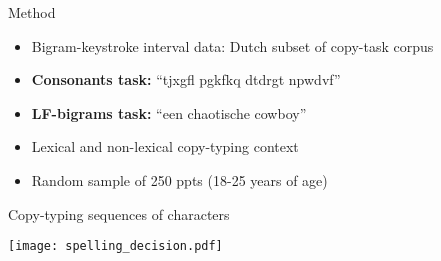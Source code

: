 \begin{frame}{Method}

\begin{itemize}
	\item Bigram-keystroke interval data: Dutch subset of copy-task corpus \parencite{waes2019,van2019multilingual}
	\item \textbf{Consonants task:} ``tjxgfl pgkfkq dtdrgt npwdvf''
	\item \textbf{LF-bigrams task:} ``een chaotische cowboy''
	\item Lexical and non-lexical copy-typing context
	\item Random sample of 250 ppts (18-25 years of age)
\end{itemize}

\end{frame}


\begin{frame}{Copy-typing sequences of characters}
	
	\begin{center}
		\texttt{[image: spelling\_decision.pdf]}
	\end{center}
	
\end{frame}

